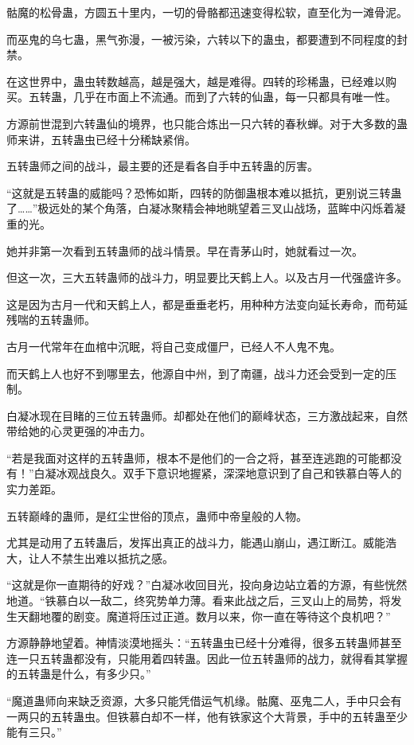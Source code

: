 \begin{this_body}
骷魔的松骨蛊，方圆五十里内，一切的骨骼都迅速变得松软，直至化为一滩骨泥。

而巫鬼的乌七蛊，黑气弥漫，一被污染，六转以下的蛊虫，都要遭到不同程度的封禁。

在这世界中，蛊虫转数越高，越是强大，越是难得。四转的珍稀蛊，已经难以购买。五转蛊，几乎在市面上不流通。而到了六转的仙蛊，每一只都具有唯一性。

方源前世混到六转蛊仙的境界，也只能合炼出一只六转的春秋蝉。对于大多数的蛊师来讲，五转蛊虫已经十分稀缺紧俏。

五转蛊师之间的战斗，最主要的还是看各自手中五转蛊的厉害。

“这就是五转蛊的威能吗？恐怖如斯，四转的防御蛊根本难以抵抗，更别说三转蛊了……”极远处的某个角落，白凝冰聚精会神地眺望着三叉山战场，蓝眸中闪烁着凝重的光。

她并非第一次看到五转蛊师的战斗情景。早在青茅山时，她就看过一次。

但这一次，三大五转蛊师的战斗力，明显要比天鹤上人。以及古月一代强盛许多。

这是因为古月一代和天鹤上人，都是垂垂老朽，用种种方法变向延长寿命，而苟延残喘的五转蛊师。

古月一代常年在血棺中沉眠，将自己变成僵尸，已经人不人鬼不鬼。

而天鹤上人也好不到哪里去，他源自中州，到了南疆，战斗力还会受到一定的压制。

白凝冰现在目睹的三位五转蛊师。却都处在他们的巅峰状态，三方激战起来，自然带给她的心灵更强的冲击力。

“若是我面对这样的五转蛊师，根本不是他们的一合之将，甚至连逃跑的可能都没有！”白凝冰观战良久。双手下意识地握紧，深深地意识到了自己和铁慕白等人的实力差距。

五转巅峰的蛊师，是红尘世俗的顶点，蛊师中帝皇般的人物。

尤其是动用了五转蛊后，发挥出真正的战斗力，能遇山崩山，遇江断江。威能浩大，让人不禁生出难以抵抗之感。

“这就是你一直期待的好戏？”白凝冰收回目光，投向身边站立着的方源，有些恍然地道。“铁慕白以一敌二，终究势单力薄。看来此战之后，三叉山上的局势，将发生天翻地覆的剧变。魔道将压过正道。数月以来，你一直在等待这个良机吧？”

方源静静地望着。神情淡漠地摇头：“五转蛊虫已经十分难得，很多五转蛊师甚至连一只五转蛊都没有，只能用着四转蛊。因此一位五转蛊师的战力，就得看其掌握的五转蛊是什么，有多少只。”

“魔道蛊师向来缺乏资源，大多只能凭借运气机缘。骷魔、巫鬼二人，手中只会有一两只的五转蛊虫。但铁慕白却不一样，他有铁家这个大背景，手中的五转蛊至少能有三只。”


\end{this_body}
